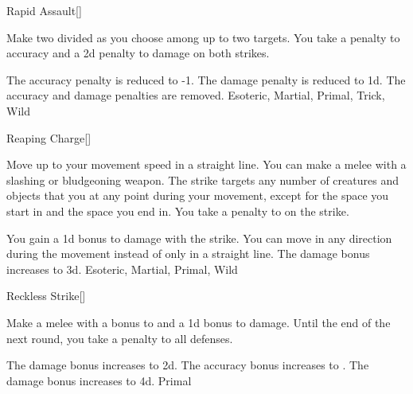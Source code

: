 \lowercase{\hypertarget{maneuver:Rapid Assault}{}}\label{maneuver:Rapid Assault}
\hypertarget{maneuver:Rapid Assault}{}
\begin{freeability}[Rank 1]{Rapid Assault}[]

Make two  divided as you choose among up to two targets.
You take a  penalty to accuracy and a \minus2d penalty to damage on both strikes.

\rankline
{} The accuracy penalty is reduced to -1.
 The damage penalty is reduced to \minus1d.
 The accuracy and damage penalties are removed.
 Esoteric, Martial, Primal, Trick, Wild
\end{freeability}
\vspace{0.25em}



\lowercase{\hypertarget{maneuver:Reaping Charge}{}}\label{maneuver:Reaping Charge}
\hypertarget{maneuver:Reaping Charge}{}
\begin{freeability}[Rank 1]{Reaping Charge}[]

Move up to your movement speed in a straight line.
You can make a melee  with a slashing or bludgeoning weapon.
The strike targets any number of creatures and objects that you  at any point during your movement, except for the space you start in and the space you end in.
You take a  penalty to  on the strike.

\rankline
{} You gain a \plus1d bonus to damage with the strike.
 You can move in any direction during the movement instead of only in a straight line.
 The damage bonus increases to \plus3d.
 Esoteric, Martial, Primal, Wild
\end{freeability}
\vspace{0.25em}



\lowercase{\hypertarget{maneuver:Reckless Strike}{}}\label{maneuver:Reckless Strike}
\hypertarget{maneuver:Reckless Strike}{}
\begin{freeability}[Rank 1]{Reckless Strike}[]

Make a melee  with a  bonus to  and a \plus1d bonus to damage.
Until the end of the next round, you take a  penalty to all defenses.

\rankline
{} The damage bonus increases to \plus2d.
 The accuracy bonus increases to .
 The damage bonus increases to \plus4d.
 Primal
\end{freeability}
\vspace{0.25em}



